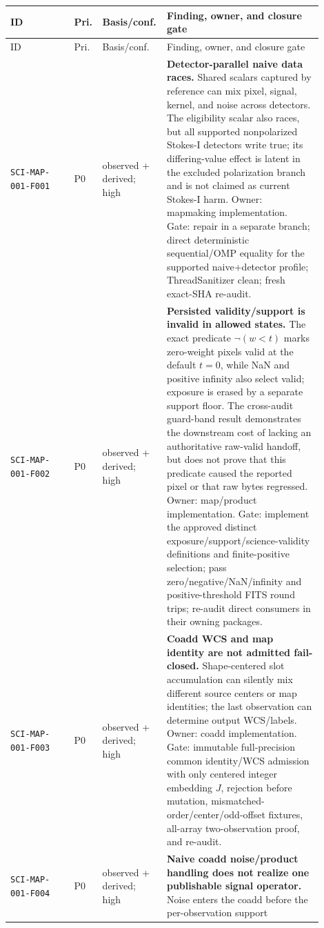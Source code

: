 \documentclass[11pt]{article}
\newcommand{\code}[1]{\nolinkurl{#1}}
\begin{document}
\begin{longtable}{L{0.20\linewidth}L{0.06\linewidth}L{0.15\linewidth}L{0.49\linewidth}}
\toprule
ID & Pri. & Basis/conf. & Finding, owner, and closure gate\\
\midrule
\endfirsthead
\toprule
ID & Pri. & Basis/conf. & Finding, owner, and closure gate\\
\midrule
\endhead
\code{SCI-MAP-001-F001} & P0 & observed + derived; high &
\textbf{Detector-parallel naive data races.}  Shared scalars captured by
reference can mix pixel, signal, kernel, and noise across detectors.  The
eligibility scalar also races, but all supported nonpolarized Stokes-I
detectors write true; its differing-value effect is latent in the excluded
polarization branch and is not claimed as current Stokes-I harm.  Owner:
mapmaking implementation.  Gate: repair in a separate
branch; direct deterministic sequential/OMP equality for the supported
naive+detector profile; ThreadSanitizer clean; fresh exact-SHA re-audit.\\
\code{SCI-MAP-001-F002} & P0 & observed + derived; high &
\textbf{Persisted validity/support is invalid in allowed states.}
The exact predicate \(\neg(w<t)\) marks zero-weight pixels valid at the default
\(t=0\), while NaN and positive infinity also select valid; exposure is erased
by a separate support floor.  The cross-audit guard-band result demonstrates
the downstream cost of lacking an authoritative raw-valid handoff, but does not
prove that this predicate caused the reported pixel or that raw bytes regressed.
Owner: map/product implementation.  Gate: implement the approved distinct
exposure/support/science-validity definitions and finite-positive selection;
pass zero/negative/NaN/infinity and positive-threshold FITS round trips;
re-audit direct consumers in their owning packages.\\
\code{SCI-MAP-001-F003} & P0 & observed + derived; high &
\textbf{Coadd WCS and map identity are not admitted fail-closed.}  Shape-centered
slot accumulation can silently mix different source centers or map identities;
the last observation can determine output WCS/labels.  Owner: coadd
implementation.  Gate: immutable full-precision common identity/WCS admission
with only centered integer embedding \(J\), rejection before mutation,
mismatched-order/center/odd-offset fixtures, all-array two-observation proof,
and re-audit.\\
\code{SCI-MAP-001-F004} & P0 & observed + derived; high &
\textbf{Naive coadd noise/product handling does not realize one publishable
signal operator.}  Noise enters the coadd before the per-observation support

\end{longtable}
\end{document}
